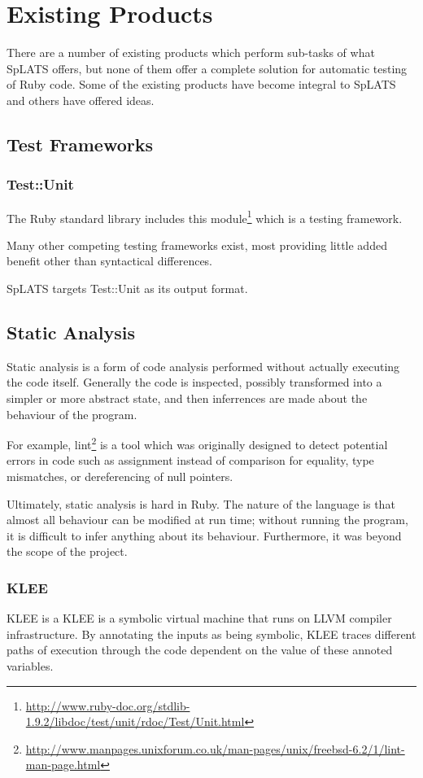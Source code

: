 \chapter{Existing Products}

There are a number of existing products which perform sub-tasks of what SpLATS offers, but none of them offer a complete solution for automatic testing of Ruby code. Some of the existing products have become integral to SpLATS and others have offered ideas.

\section{Test Frameworks}

  \subsection{Test::Unit}
    The Ruby standard library includes this
module\footnote{\url{http://www.ruby-doc.org/stdlib-1.9.2/libdoc/test/unit/rdoc/Test/Unit.html}}
which is a testing framework.

Many other competing testing frameworks exist, most providing little added
benefit other than syntactical differences.

SpLATS targets Test::Unit as its output format.

\section{Static Analysis}

  Static analysis is a form of code analysis performed without actually
  executing the code itself. Generally the code is inspected, possibly
  transformed into a simpler or more abstract state, and then inferrences
  are made about the behaviour of the program.

  For example, lint\footnote{\url{http://www.manpages.unixforum.co.uk/man-pages/unix/freebsd-6.2/1/lint-man-page.html}}
  is a tool which was originally designed to detect potential errors in
  code such as assignment instead of comparison for equality, type mismatches,
  or dereferencing of null pointers.

  Ultimately, static analysis is hard in Ruby. The nature of the language is that
  almost all behaviour can be modified at run time; without running the program,
  it is difficult to infer anything about its behaviour. Furthermore, it was beyond
  the scope of the project.

  \subsection{KLEE}
  KLEE is a KLEE is a symbolic virtual machine that runs on LLVM compiler
  infrastructure. By annotating the inputs as being symbolic, KLEE traces
  different paths of execution through the code dependent on the value of
  these annoted variables.

